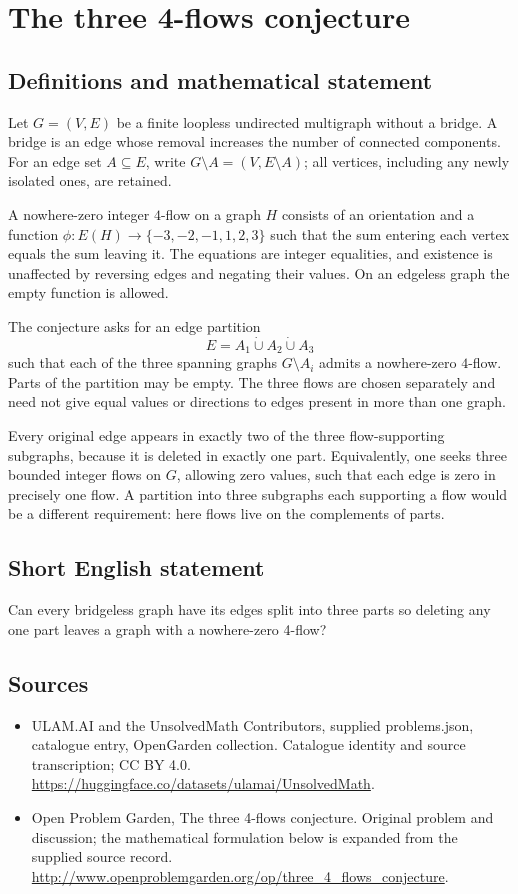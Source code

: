 \documentclass[11pt,a4paper]{article}
\begin{document}
\section*{The three 4-flows conjecture}\label{statement}

\subsection{Definitions and mathematical statement}
Let $G=(V,E)$ be a finite loopless
undirected multigraph without a
bridge. A bridge is an edge
whose removal increases the
number of connected components.
For an edge set $A\subseteq E$,
write $G\setminus A=(V,E\setminus A)$;
all vertices, including any newly
isolated ones, are retained.

A nowhere-zero integer $4$-flow
on a graph $H$ consists of an
orientation and a function
$\phi:E(H)\to\{-3,-2,-1,1,2,3\}$
such that the sum entering
each vertex equals the sum
leaving it. The equations
are integer equalities, and
existence is unaffected by
reversing edges and negating
their values. On an edgeless
graph the empty function is
allowed.

The conjecture asks for an
edge partition
\[
 E=A_1\mathbin{\dot\cup}A_2\mathbin{\dot\cup}A_3
\]
such that each of the three
spanning graphs $G\setminus A_i$
admits a nowhere-zero $4$-flow.
Parts of the partition may
be empty. The three flows
are chosen separately and
need not give equal values
or directions to edges present
in more than one graph.

Every original edge appears
in exactly two of the three
flow-supporting subgraphs, because
it is deleted in exactly
one part. Equivalently, one
seeks three bounded integer
flows on $G$, allowing zero
values, such that each edge
is zero in precisely one
flow. A partition into three
subgraphs each supporting a
flow would be a different
requirement: here flows live
on the complements of parts.
\subsection{Short English statement}
Can every bridgeless graph have its edges split into three parts so deleting any one part leaves a graph with a nowhere-zero 4-flow?
\subsection{Sources}
\begin{itemize}
\item[S1] ULAM.AI and the UnsolvedMath Contributors, supplied problems.json, catalogue entry, OpenGarden collection. Catalogue identity and source transcription; CC BY 4.0.
\url{https://huggingface.co/datasets/ulamai/UnsolvedMath}.
\item[S2] Open Problem Garden, The three 4-flows conjecture. Original problem and discussion; the mathematical formulation below is expanded from the supplied source record.
\url{http://www.openproblemgarden.org/op/three_4_flows_conjecture}.
\end{itemize}
\end{document}
